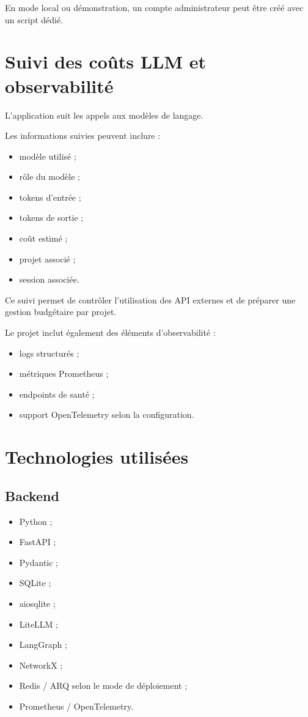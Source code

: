 \documentclass[
  french,
]{report}
\providecommand{\tightlist}{%
  \setlength{\itemsep}{0pt}\setlength{\parskip}{0pt}}
\begin{document}
En mode local ou démonstration, un compte administrateur peut être créé
avec un script dédié.

\chapter{Suivi des coûts LLM et
observabilité}\label{suivi-des-couxfbts-llm-et-observabilituxe9}

L'application suit les appels aux modèles de langage.

Les informations suivies peuvent inclure :

\begin{itemize}
\tightlist
\item
  modèle utilisé ;
\item
  rôle du modèle ;
\item
  tokens d'entrée ;
\item
  tokens de sortie ;
\item
  coût estimé ;
\item
  projet associé ;
\item
  session associée.
\end{itemize}

Ce suivi permet de contrôler l'utilisation des API externes et de
préparer une gestion budgétaire par projet.

Le projet inclut également des éléments d'observabilité :

\begin{itemize}
\tightlist
\item
  logs structurés ;
\item
  métriques Prometheus ;
\item
  endpoints de santé ;
\item
  support OpenTelemetry selon la configuration.
\end{itemize}

\chapter{Technologies utilisées}\label{technologies-utilisuxe9es}

\section{Backend}\label{backend-1}

\begin{itemize}
\tightlist
\item
  Python ;
\item
  FastAPI ;
\item
  Pydantic ;
\item
  SQLite ;
\item
  aiosqlite ;
\item
  LiteLLM ;
\item
  LangGraph ;
\item
  NetworkX ;
\item
  Redis / ARQ selon le mode de déploiement ;
\item
  Prometheus / OpenTelemetry.
\end{itemize}
\end{document}

